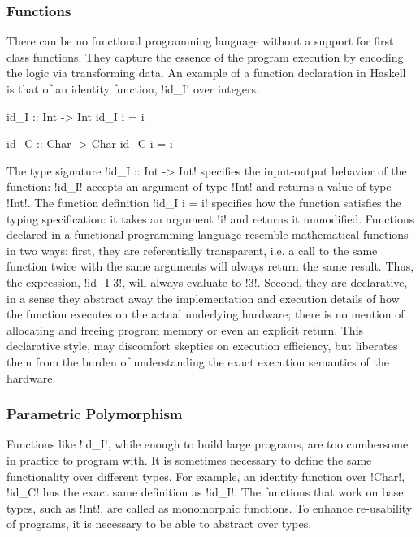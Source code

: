 \documentclass[screen,nonacm]{acmart}
\begin{document}
\subsubsection{Functions}
There can be no functional programming language without a support for first class
functions. They capture the essence of the program execution by encoding the logic via
transforming data. An example of a function declaration in Haskell is that of an identity
function, !id_I! over integers.


\begin{minipage}{0.5\linewidth}
\begin{code}
            id_I :: Int -> Int
            id_I i = i
\end{code}
\end{minipage}%
\begin{minipage}{0.5\linewidth}
\begin{code}
            id_C :: Char -> Char
            id_C i = i
\end{code}
\end{minipage}

The type signature !id_I :: Int -> Int! specifies the input-output behavior of the
function: !id_I! accepts an argument of type !Int! and returns a value of type !Int!. The
function definition !id_I i = i! specifies how the function satisfies the typing
specification: it takes an argument !i! and returns it unmodified. Functions declared in a
functional programming language resemble mathematical functions in two ways: first, they
are referentially transparent, i.e.  a call to the same function twice with the same
arguments will always return the same result. Thus, the expression, !id_I 3!, will always
evaluate to !3!. Second, they are declarative, in a sense they abstract away the
implementation and execution details of how the function executes on the actual underlying
hardware; there is no mention of allocating and freeing program memory or even an explicit
return. This declarative style, may discomfort skeptics on execution efficiency, but
liberates them from the burden of understanding the exact execution semantics of the
hardware.


\subsubsection{Parametric Polymorphism}
Functions like !id_I!, while enough to build large programs, are too cumbersome in
practice to program with. It is sometimes necessary to define the same functionality over
different types. For example, an identity function over !Char!, !id_C! has the exact same
definition as !id_I!. The functions that work on base types, such as !Int!, are called as
monomorphic functions. To enhance re-usability of programs, it is necessary to be able to
abstract over types.
\end{document}
